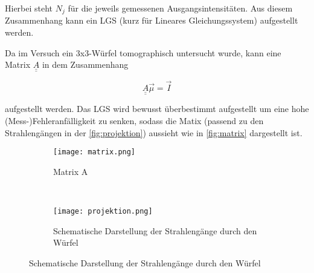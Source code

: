 Hierbei steht $N_j$ für die jeweils gemessenen Ausgangsintensitäten. Aus diesem Zusammenhang kann ein LGS (kurz für Lineares Gleichungssystem) aufgestellt werden.

\noindent
Da im Versuch ein 3x3-Würfel tomographisch untersucht wurde, kann eine Matrix $\underline{\underline{A}}$ in dem Zusammenhang 

\begin{equation}
  \underline{\underline{A}} \vec{\mu} = \vec{I} 
  \label{eqn:matrix}
\end{equation}

aufgestellt werden. Das LGS wird bewusst überbestimmt aufgestellt um eine hohe (Mess-)Fehleranfälligkeit zu senken, sodass die Matix (passend zu den Strahlengängen in der
\autoref{fig:projektion}) aussieht wie in \autoref{fig:matrix} dargestellt ist.

\begin{figure}[H]
	\centering
	\begin{subfigure}[b]{0.45\textwidth}
		\centering
		\texttt{[image: matrix.png]}
		\caption{Matrix A}
    \label{fig:matrix}
	\end{subfigure}
	~
	\begin{subfigure}[b]{0.45\textwidth}
		\centering
		\texttt{[image: projektion.png]}
		\caption{Schematische Darstellung der Strahlengänge durch den Würfel}
    \label{fig:projektion}
	\end{subfigure}
\end{figure}

